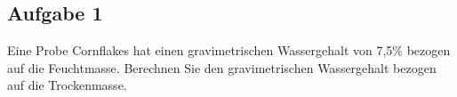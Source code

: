 \documentclass[a4paper,11pt]{article}
\newif\ifshowme
\begin{document}
%
%
%


\subsection*{Aufgabe 1}
Eine Probe Cornflakes hat einen gravimetrischen Wassergehalt von 7,5\% bezogen auf die
Feuchtmasse. Berechnen Sie den gravimetrischen Wassergehalt bezogen auf die
Trockenmasse.
\end{document}
